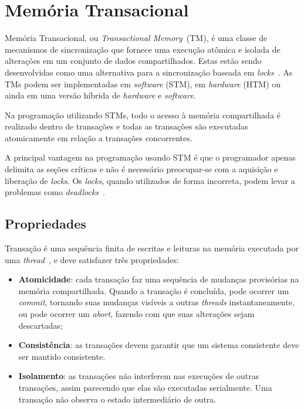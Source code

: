 \documentclass[diss,capa]{texufpel}
\begin{document}
\chapter{Memória Transacional}
\label{chapter::stm}

Memória Transacional, ou \emph{Transactional Memory}~(TM), é uma classe de mecanismos de sincronização que fornece uma execução atômica e isolada de alterações em um conjunto de dados compartilhados. Estas estão sendo desenvolvidas como uma alternativa para a sincronização baseada em \emph{locks}~\cite{energyawaretm}. As TMs podem ser implementadas em \emph{software} (STM), em \emph{hardware} (HTM) ou ainda em uma versão híbrida de \emph{hardware} e \emph{software}.

Na programação utilizando STMs, todo o acesso à memória compartilhada é realizado dentro de transações e todas as transações são executadas atomicamente em relação a transações concorrentes.

A principal vantagem na programação usando STM é que o programador apenas delimita as seções críticas e não é necessário preocupar-se com a aquisição e liberação de \emph{locks}. Os \emph{locks}, quando utilizados de forma incorreta, podem levar a problemas como \emph{deadlocks}~\cite{BAND10}.

\section{Propriedades}

Transação é uma sequência finita de escritas e leituras na memória executada por uma \emph{thread}~\cite{herlihy93}, e deve satisfazer três propriedades:

\begin{itemize}
\item \textbf{Atomicidade}: cada transação faz uma sequência de mudanças provisórias na memória compartilhada. Quando a transação é concluída, pode ocorrer um \emph{commit}, tornando suas mudanças visíveis a outras \emph{threads} instantaneamente, ou pode ocorrer um \emph{abort}, fazendo com que suas alterações sejam descartadas;

\item \textbf{Consistência}: as transações devem garantir que um sistema consistente deve ser mantido consistente.

\item \textbf{Isolamento}: as transações não interferem nas execuções de outras transações, assim parecendo que elas são executadas serialmente. Uma transação não observa o estado intermediário de outra.
\end{itemize}
\end{document}
